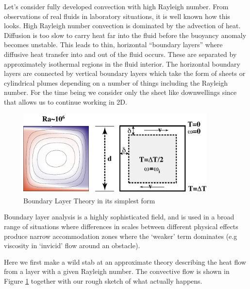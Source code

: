\documentclass[10pt]{article}
\begin{document}
	Let's consider fully developed convection with high Rayleigh number. From
	observations of real fluids in laboratory situations, it is well known
	how this looks. High Rayleigh number convection is dominated by the advection
	of heat. Diffusion is too slow to carry heat far into the fluid before the buoyancy
	anomaly becomes unstable. This leads to thin, horizontal ``boundary layers'' where diffusive
	heat transfer into and out of the fluid occurs. These are separated by approximately
	isothermal regions in the fluid interior. The horizontal boundary layers are connected
	by vertical boundary layers which take the form of sheets or cylindrical plumes depending
	on a number of things including the Rayleigh number. For the time being we consider
	only the sheet like downwellings since that allows us to continue working in 2D.
	
		\begin{figure}[h]
			\begin{center}
				\includegraphics[width=100mm]{Diagrams/blt}
				\caption[]{ \label{fig:blt1}
					Boundary Layer Theory in its simplest form}
			\end{center}	
		\end{figure}
		
	Boundary layer analysis is a highly sophisticated field, and is used in a broad
	range of situations where differences in scales between different physical
	effects produce narrow accommodation zones where the `weaker' term
	dominates (e.g viscosity in `invicid' flow around an obstacle).
	
	Here we first make a wild stab at an approximate theory describing the
	heat flow from a layer with a given Rayleigh number. The convective
	flow is shown in Figure \ref{fig:blt1} together with our rough sketch of
	what actually happens. 
	
\end{document}
